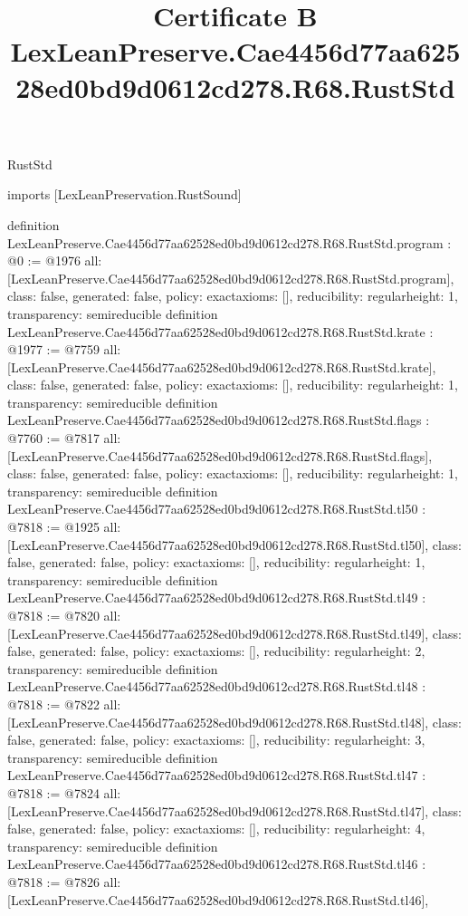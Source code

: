 \begin{lexlean}{RustStd}
\title{Certificate B LexLeanPreserve.Cae4456d77aa62528ed0bd9d0612cd278.R68.RustStd}
\begin{coremodule}
imports [LexLeanPreservation.RustSound]

definition LexLeanPreserve.Cae4456d77aa62528ed0bd9d0612cd278.R68.RustStd.program : @0 := @1976 {
  all: [LexLeanPreserve.Cae4456d77aa62528ed0bd9d0612cd278.R68.RustStd.program],
  class: false,
  generated: false,
  policy: exact{axioms: []},
  reducibility: regular{height: 1},
  transparency: semireducible
}
definition LexLeanPreserve.Cae4456d77aa62528ed0bd9d0612cd278.R68.RustStd.krate : @1977 := @7759 {
  all: [LexLeanPreserve.Cae4456d77aa62528ed0bd9d0612cd278.R68.RustStd.krate],
  class: false,
  generated: false,
  policy: exact{axioms: []},
  reducibility: regular{height: 1},
  transparency: semireducible
}
definition LexLeanPreserve.Cae4456d77aa62528ed0bd9d0612cd278.R68.RustStd.flags : @7760 := @7817 {
  all: [LexLeanPreserve.Cae4456d77aa62528ed0bd9d0612cd278.R68.RustStd.flags],
  class: false,
  generated: false,
  policy: exact{axioms: []},
  reducibility: regular{height: 1},
  transparency: semireducible
}
definition LexLeanPreserve.Cae4456d77aa62528ed0bd9d0612cd278.R68.RustStd.tl50 : @7818 := @1925 {
  all: [LexLeanPreserve.Cae4456d77aa62528ed0bd9d0612cd278.R68.RustStd.tl50],
  class: false,
  generated: false,
  policy: exact{axioms: []},
  reducibility: regular{height: 1},
  transparency: semireducible
}
definition LexLeanPreserve.Cae4456d77aa62528ed0bd9d0612cd278.R68.RustStd.tl49 : @7818 := @7820 {
  all: [LexLeanPreserve.Cae4456d77aa62528ed0bd9d0612cd278.R68.RustStd.tl49],
  class: false,
  generated: false,
  policy: exact{axioms: []},
  reducibility: regular{height: 2},
  transparency: semireducible
}
definition LexLeanPreserve.Cae4456d77aa62528ed0bd9d0612cd278.R68.RustStd.tl48 : @7818 := @7822 {
  all: [LexLeanPreserve.Cae4456d77aa62528ed0bd9d0612cd278.R68.RustStd.tl48],
  class: false,
  generated: false,
  policy: exact{axioms: []},
  reducibility: regular{height: 3},
  transparency: semireducible
}
definition LexLeanPreserve.Cae4456d77aa62528ed0bd9d0612cd278.R68.RustStd.tl47 : @7818 := @7824 {
  all: [LexLeanPreserve.Cae4456d77aa62528ed0bd9d0612cd278.R68.RustStd.tl47],
  class: false,
  generated: false,
  policy: exact{axioms: []},
  reducibility: regular{height: 4},
  transparency: semireducible
}
definition LexLeanPreserve.Cae4456d77aa62528ed0bd9d0612cd278.R68.RustStd.tl46 : @7818 := @7826 {
  all: [LexLeanPreserve.Cae4456d77aa62528ed0bd9d0612cd278.R68.RustStd.tl46],
}
\end{coremodule}
\end{lexlean}
